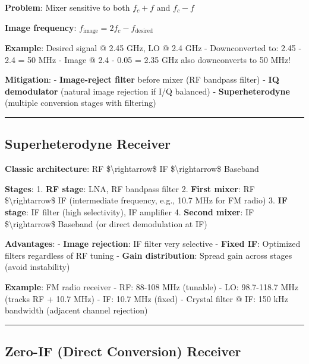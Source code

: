 \textbf{Problem}: Mixer sensitive to both \(f_c + f\) and \(f_c - f\)

\textbf{Image frequency}:
\(f_{\text{image}} = 2f_c - f_{\text{desired}}\)

\textbf{Example}: Desired signal @ 2.45 GHz, LO @ 2.4 GHz -
Downconverted to: 2.45 - 2.4 = 50 MHz - Image @ 2.4 - 0.05 = 2.35 GHz
also downconverts to 50 MHz!

\textbf{Mitigation}: - \textbf{Image-reject filter} before mixer (RF
bandpass filter) - \textbf{IQ demodulator} (natural image rejection if
I/Q balanced) - \textbf{Superheterodyne} (multiple conversion stages
with filtering)

\begin{center}\rule{0.5\linewidth}{0.5pt}\end{center}

\subsection{Superheterodyne Receiver}\label{superheterodyne-receiver}

\textbf{Classic architecture}: RF \$\textbackslash rightarrow\$ IF
\$\textbackslash rightarrow\$ Baseband

\textbf{Stages}: 1. \textbf{RF stage}: LNA, RF bandpass filter 2.
\textbf{First mixer}: RF \$\textbackslash rightarrow\$ IF (intermediate
frequency, e.g., 10.7 MHz for FM radio) 3. \textbf{IF stage}: IF filter
(high selectivity), IF amplifier 4. \textbf{Second mixer}: IF
\$\textbackslash rightarrow\$ Baseband (or direct demodulation at IF)

\textbf{Advantages}: - \textbf{Image rejection}: IF filter very
selective - \textbf{Fixed IF}: Optimized filters regardless of RF tuning
- \textbf{Gain distribution}: Spread gain across stages (avoid
instability)

\textbf{Example}: FM radio receiver - RF: 88-108 MHz (tunable) - LO:
98.7-118.7 MHz (tracks RF + 10.7 MHz) - IF: 10.7 MHz (fixed) - Crystal
filter @ IF: 150 kHz bandwidth (adjacent channel rejection)

\begin{center}\rule{0.5\linewidth}{0.5pt}\end{center}

\subsection{Zero-IF (Direct Conversion)
Receiver}\label{zero-if-direct-conversion-receiver}

